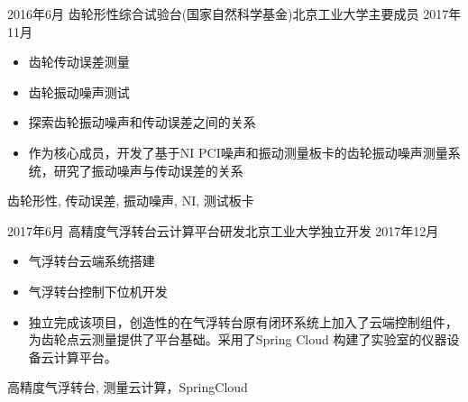 \begin{experiences}
  \emptySeparator
  \experience
  {2016年6月} {齿轮形性综合试验台(国家自然科学基金)}{北京工业大学}{主要成员}
  {2017年11月 }    {
				  	\begin{itemize}
				  		\item 齿轮传动误差测量
				  		\item 齿轮振动噪声测试
				  		\item 探索齿轮振动噪声和传动误差之间的关系
				  		\item 作为核心成员，开发了基于NI PCI噪声和振动测量板卡的齿轮振动噪声测量系统，研究了振动噪声与传动误差的关系
				  	\end{itemize}
				  }
				  {齿轮形性, 传动误差, 振动噪声, NI, 测试板卡}

  \emptySeparator
  \experience
  {2017年6月} {高精度气浮转台云计算平台研发}{北京工业大学}{独立开发}
  {2017年12月}    {
  	\begin{itemize}
  		\item 气浮转台云端系统搭建
  		\item 气浮转台控制下位机开发
  		\item 独立完成该项目，创造性的在气浮转台原有闭环系统上加入了云端控制组件，为齿轮点云测量提供了平台基础。采用了Spring Cloud 构建了实验室的仪器设备云计算平台。
  	\end{itemize}
  }
  {高精度气浮转台, 测量云计算，SpringCloud}
		  				  

\end{experiences}
